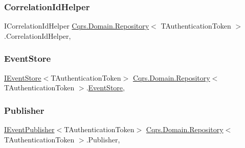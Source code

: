 \subsubsection{\texorpdfstring{Correlation\+Id\+Helper}{CorrelationIdHelper}}
{\footnotesize\ttfamily I\+Correlation\+Id\+Helper \hyperlink{classCqrs_1_1Domain_1_1Repository}{Cqrs.\+Domain.\+Repository}$<$ T\+Authentication\+Token $>$.Correlation\+Id\+Helper\hspace{0.3cm}{\ttfamily [get]}, {\ttfamily [protected]}}

\mbox{\label{classCqrs_1_1Domain_1_1Repository_a9adbd73546e04ef67c8fb032e9c6d1a8_a9adbd73546e04ef67c8fb032e9c6d1a8}} 
\subsubsection{\texorpdfstring{Event\+Store}{EventStore}}
{\footnotesize\ttfamily \hyperlink{interfaceCqrs_1_1Events_1_1IEventStore}{I\+Event\+Store}$<$T\+Authentication\+Token$>$ \hyperlink{classCqrs_1_1Domain_1_1Repository}{Cqrs.\+Domain.\+Repository}$<$ T\+Authentication\+Token $>$.\hyperlink{classCqrs_1_1Events_1_1EventStore}{Event\+Store}\hspace{0.3cm}{\ttfamily [get]}, {\ttfamily [protected]}}

\mbox{\label{classCqrs_1_1Domain_1_1Repository_a11b1d3a66404b212e93ca706e7c5eea4_a11b1d3a66404b212e93ca706e7c5eea4}} 
\subsubsection{\texorpdfstring{Publisher}{Publisher}}
{\footnotesize\ttfamily \hyperlink{interfaceCqrs_1_1Events_1_1IEventPublisher}{I\+Event\+Publisher}$<$T\+Authentication\+Token$>$ \hyperlink{classCqrs_1_1Domain_1_1Repository}{Cqrs.\+Domain.\+Repository}$<$ T\+Authentication\+Token $>$.Publisher\hspace{0.3cm}{\ttfamily [get]}, {\ttfamily [protected]}}

